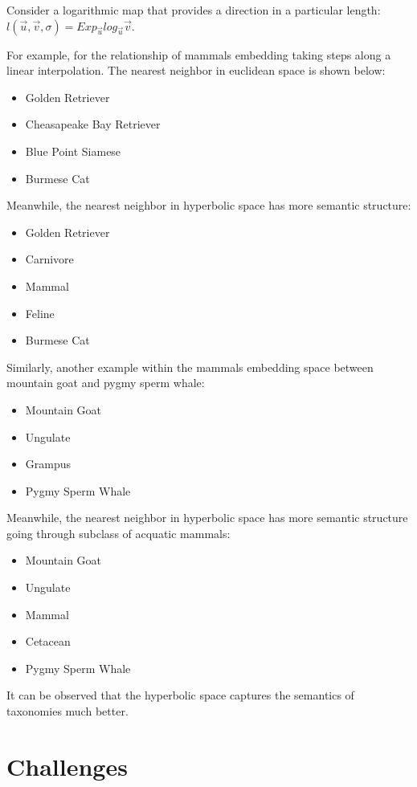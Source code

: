  Consider a logarithmic map that provides a direction in a particular length:
 $l(\vec{u},\vec{v},\sigma)= Exp_{\vec{u}} log_{\vec{u}}\vec{v}$.
 
 For example, for the relationship of mammals embedding taking steps along a linear interpolation. The nearest neighbor in euclidean space is shown below:
\begin{itemize}
    \item Golden Retriever
    \item Cheasapeake Bay Retriever
    \item Blue Point Siamese
    \item Burmese Cat
\end{itemize}

Meanwhile, the nearest neighbor in hyperbolic space has more semantic structure:
\begin{itemize}
    \item Golden Retriever
    \item Carnivore
    \item Mammal
    \item Feline
    \item Burmese Cat
\end{itemize}

Similarly, another example within the mammals embedding space between mountain goat and pygmy sperm whale:
\begin{itemize}
    \item Mountain Goat
    \item Ungulate
    \item Grampus
    \item Pygmy Sperm Whale
\end{itemize}

Meanwhile, the nearest neighbor in hyperbolic space has more semantic structure going through subclass of acquatic mammals:
\begin{itemize}
    \item Mountain Goat
    \item Ungulate
    \item Mammal
    \item Cetacean
    \item Pygmy Sperm Whale
\end{itemize}

It can be observed that the hyperbolic space captures the semantics of taxonomies much better.


\section{Challenges}


